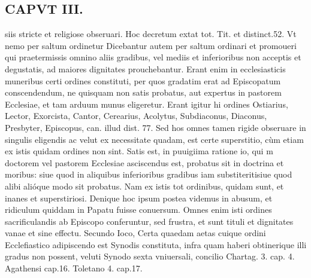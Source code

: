 \documentclass{article}
\begin{document}
\begin{pages}
\section*{CAPVT  III. }
\marginpar{[ p.147 ]}\pstart siis stricte et religiose obseruari. Hoc decretum extat tot. Tit. et distinct.52. Vt nemo per saltum ordinetur Dicebantur autem per saltum ordinari et promoueri qui praetermissis omnino aliis gradibus, vel mediis et inferioribus non acceptis et degustatis, ad maiores dignitates prouchebantur. Erant enim in ecclesiasticis muneribus certi ordines constituti, per quos gradatim erat ad Episcopatum conscendendum, ne quisquam non satis probatus, aut expertus in pastorem Ecclesiae, et tam arduum munus eligeretur. Erant igitur hi ordines Ostiarius, Lector, Exorcista, Cantor, Cerearius, Acolytus, Subdiaconus, Diaconus, Presbyter, Episcopus, can. illud dist. 77. Sed hos omnes tamen rigide obseruare in singulis eligendis ac velut ex necessitate quadam, est certe superstitio, cùm etiam ex istis quidam ordines non sint. Satis est, in puuigiima ratione io, qui m doctorem vel pastorem Ecclesiae asciscendus est, probatus sit in doctrina et moribus: siue quod in aliquibus inferioribus gradibus iam substiteritisiue quod alibi alióque  modo sit probatus. Nam ex istis tot ordinibus, quidam sunt, et inanes et superstiriosi.  \pend\pstart Denique hoc ipsum postea videmus in abusum, et ridiculum quiddam in Papatu fuisse conuersum. Omnes enim isti ordines sacrificulandis ab Episcopo conferuntur, sed frustra, et sunt tituli et dignitates vanae et sine effectu. Secundo Ioco, Certa quaedam aetas cuique ordini Ecclefiastico adipiscendo est Synodis constituta, infra quam haberi obtinerique illi gradus non possent, veluti Synodo sexta vniuersali, concilio Chartag. 3. cap. 4. Agathensi cap.16. Toletano 4. cap.17.  \pend

\end{pages}
\end{document}
